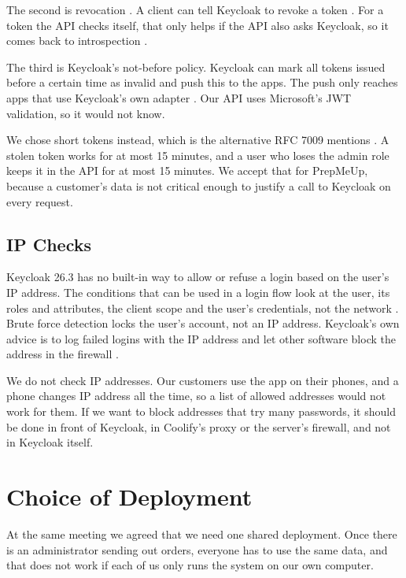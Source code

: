 \documentclass[a4paper,11pt]{article}
\begin{document}
The second is revocation \cite{ietf-rfc7009-token-revocation}. A client can tell Keycloak to revoke a token \cite[sec.~Token Revocation endpoint]{keycloak-securing-apps-oidc}. For a token the API checks itself, that only helps if the API also asks Keycloak, so it comes back to introspection \cite[sec.~3]{ietf-rfc7009-token-revocation}.

The third is Keycloak's not-before policy. Keycloak can mark all tokens issued before a certain time as invalid and push this to the apps. The push only reaches apps that use Keycloak's own adapter \cite[sec.~Revoking active sessions]{keycloak-server-admin-guide}. Our API uses Microsoft's JWT validation, so it would not know.

We chose short tokens instead, which is the alternative RFC 7009 mentions \cite[sec.~3]{ietf-rfc7009-token-revocation}. A stolen token works for at most 15 minutes, and a user who loses the admin role keeps it in the API for at most 15 minutes. We accept that for PrepMeUp, because a customer's data is not critical enough to justify a call to Keycloak on every request.

\subsection{IP Checks}
Keycloak 26.3 has no built-in way to allow or refuse a login based on the user's IP address. The conditions that can be used in a login flow look at the user, its roles and attributes, the client scope and the user's credentials, not the network \cite[sec.~Available conditions]{keycloak-server-admin-guide}. Brute force detection locks the user's account, not an IP address. Keycloak's own advice is to log failed logins with the IP address and let other software block the address in the firewall \cite[sec.~Downside of Keycloak brute force detection]{keycloak-server-admin-guide}.

We do not check IP addresses. Our customers use the app on their phones, and a phone changes IP address all the time, so a list of allowed addresses would not work for them. If we want to block addresses that try many passwords, it should be done in front of Keycloak, in Coolify's proxy or the server's firewall, and not in Keycloak itself.

\section{Choice of Deployment}
\label{sec:deployment}
At the same meeting we agreed that we need one shared deployment. Once there is an administrator sending out orders, everyone has to use the same data, and that does not work if each of us only runs the system on our own computer.
\end{document}
